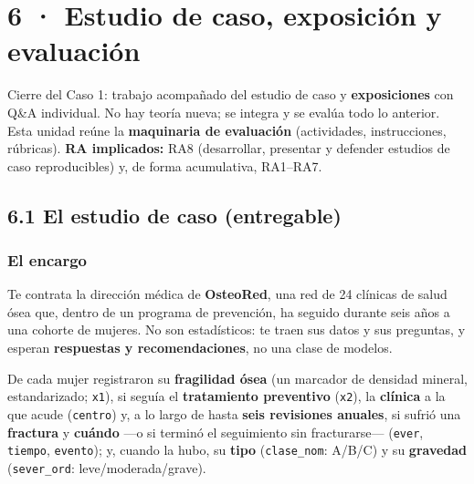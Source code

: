 \documentclass[
  letterpaper,
  DIV=11,
  numbers=noendperiod]{scrartcl}
\begin{document}
\hypertarget{sec-u16}{%
\section{6 · Estudio de caso, exposición y evaluación}\label{sec-u16}}

\begin{tcolorbox}[enhanced jigsaw, coltitle=black, rightrule=.15mm, arc=.35mm, leftrule=.75mm, colback=white, colbacktitle=quarto-callout-note-color!10!white, left=2mm, breakable, toptitle=1mm, toprule=.15mm, bottomtitle=1mm, titlerule=0mm, title=\textcolor{quarto-callout-note-color}{\faInfo}\hspace{0.5em}{Sobre esta unidad}, bottomrule=.15mm, opacityback=0, opacitybacktitle=0.6, colframe=quarto-callout-note-color-frame]

Cierre del Caso 1: trabajo acompañado del estudio de caso y
\textbf{exposiciones} con Q\&A individual. No hay teoría nueva; se
integra y se evalúa todo lo anterior. Esta unidad reúne la
\textbf{maquinaria de evaluación} (actividades, instrucciones,
rúbricas). \textbf{RA implicados:} RA8 (desarrollar, presentar y
defender estudios de caso reproducibles) y, de forma acumulativa,
RA1--RA7.

\end{tcolorbox}

\hypertarget{sec-u16-caso}{%
\subsection{6.1 El estudio de caso (entregable)}\label{sec-u16-caso}}

\hypertarget{el-encargo}{%
\subsubsection{El encargo}\label{el-encargo}}

Te contrata la dirección médica de \textbf{OsteoRed}, una red de 24
clínicas de salud ósea que, dentro de un programa de prevención, ha
seguido durante seis años a una cohorte de mujeres. No son estadísticos:
te traen sus datos y sus preguntas, y esperan \textbf{respuestas y
recomendaciones}, no una clase de modelos.

De cada mujer registraron su \textbf{fragilidad ósea} (un marcador de
densidad mineral, estandarizado; \texttt{x1}), si seguía el
\textbf{tratamiento preventivo} (\texttt{x2}), la \textbf{clínica} a la
que acude (\texttt{centro}) y, a lo largo de hasta \textbf{seis
revisiones anuales}, si sufrió una \textbf{fractura} y \textbf{cuándo}
---o si terminó el seguimiento sin fracturarse--- (\texttt{ever},
\texttt{tiempo}, \texttt{evento}); y, cuando la hubo, su \textbf{tipo}
(\texttt{clase\_nom}: A/B/C) y su \textbf{gravedad}
(\texttt{sever\_ord}: leve/moderada/grave).
\end{document}
